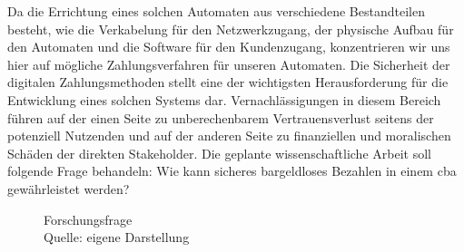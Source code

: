 Da die Errichtung eines solchen Automaten aus verschiedene Bestandteilen besteht, wie die Verkabelung 
für den Netzwerkzugang, der physische Aufbau für den Automaten und die Software für den Kundenzugang, 
konzentrieren wir uns hier auf mögliche Zahlungsverfahren für unseren Automaten. Die Sicherheit der 
digitalen Zahlungsmethoden stellt eine der wichtigsten Herausforderung für die Entwicklung eines 
solchen Systems dar. Vernachlässigungen in diesem Bereich führen auf der einen Seite zu unberechenbarem
Vertrauensverlust seitens der potenziell Nutzenden und auf der anderen Seite zu finanziellen und 
moralischen Schäden der direkten Stakeholder. Die geplante wissenschaftliche Arbeit soll folgende 
Frage behandeln: Wie kann sicheres bargeldloses Bezahlen in einem \acrshort{cba} gewährleistet
werden? 

\vspace*{1cm}
\begin{figure}[H]
    \caption{Forschungsfrage \\ Quelle: eigene Darstellung}
    \label{fig:diagramrecherche}
\end{figure}